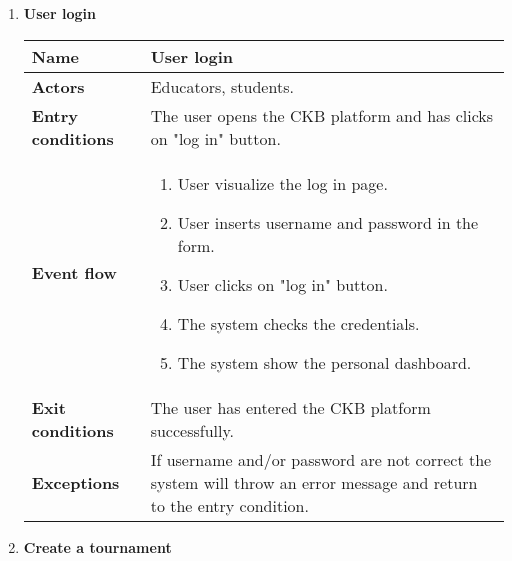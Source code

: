 \begin{enumerate}[series=usecases, label=\textbf{UC.\arabic*}]
\begin{table}[H]
\begin{tabular}{|m{3.2cm}|m{9.8cm}|}
\begin{itemize}
                    \end{itemize} \\
                    \hline 
                \end{tabular}
        \end{table}
        \item {} \textbf{User login}
        \begin{table}[H]
    	    \centering
                \renewcommand{\arraystretch}{1.5}
                \begin{tabular}{|m{3.2cm}|m{9.8cm}|}
                    \hline
                    \textbf{Name} & User login \\
                    \hline
                    \textbf{Actors} &  Educators, students. \\
                    \hline
                    \textbf{Entry conditions}  & The user opens the CKB platform and has clicks on "log in" button. \\
                    \hline
                    \textbf{Event flow}  & 
                    \begin{enumerate}[label=\arabic*.]
                        \item User visualize the log in page.
                        \item User inserts username and password in the form.
                        \item User clicks on "log in" button.
                        \item The system checks the credentials.
                        \item The system show the personal dashboard.
                    \end{enumerate}\\
                    \hline
                    \textbf{Exit conditions}  & The user has entered the CKB platform successfully. \\
                    \hline
                    \textbf{Exceptions}  & If username and/or password are not correct the system will throw an error message and return to the entry condition. \\
                    \hline 
                \end{tabular}
        \end{table}
        \item {} \textbf{Create a tournament}
        \begin{table}[H]
    	    \centering
                \renewcommand{\arraystretch}{1.5}

\end{table}
\end{enumerate}
